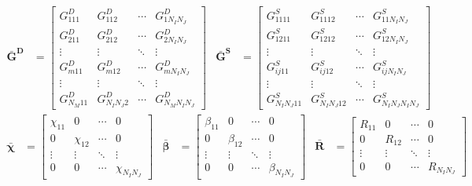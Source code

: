 			\begin{align}
				\mathbf{\bar{G}^D} &=	\begin{bmatrix}
														 G^D_{111} & G^D_{112} & \cdots & G^D_{1N_IN_J} \\
														 G^D_{211} & G^D_{212} & \cdots & G^D_{2N_IN_J} \\
														 \vdots & \vdots & \ddots & \vdots \\
													 	 G^D_{m11} & G^D_{m12} & \cdots & G^D_{mN_IN_J} \\
														 \vdots & \vdots & \ddots & \vdots \\
														 G^D_{N_M11} & G^D_{N_IN_J2} & \cdots & G^D_{N_MN_IN_J}
													 \end{bmatrix}
				&\mathbf{\bar{G}^S} &=	\begin{bmatrix}
															G^S_{1111} & G^S_{1112} & \cdots & G^S_{11N_IN_J} \\
															G^S_{1211} & G^S_{1212} & \cdots & G^S_{12N_IN_J} \\
															\vdots & \vdots & \ddots & \vdots \\
															G^S_{ij11} & G^S_{ij12} & \cdots & G^S_{ijN_IN_J} \\
															\vdots & \vdots & \ddots & \vdots \\
															G^S_{N_IN_J11} & G^S_{N_IN_J12} & \cdots & G^S_{N_IN_JN_IN_J}
														\end{bmatrix} \label{eq:3:discretization:collocation:17}
			\end{align}
			\begin{align}
				\boldsymbol{\bar{\chi}} &=	\begin{bmatrix}
															 \chi_{11} & 0 & \cdots & 0 \\
															 0 & \chi_{12} & \cdots & 0 \\
															 \vdots & \vdots & \ddots & \vdots \\
														 	 0 & 0 & \cdots & \chi_{N_IN_J}
														 \end{bmatrix}
				&\boldsymbol{\bar{\beta}} &=	\begin{bmatrix}
																	\beta_{11} & 0 & \cdots & 0 \\
																	0 & \beta_{12} & \cdots & 0 \\
																	\vdots & \vdots & \ddots & \vdots \\
																	0 & 0 & \cdots & \beta_{N_IN_J}
																\end{bmatrix}
				&\mathbf{\bar{R}} &=	\begin{bmatrix}
														R_{11} & 0 & \cdots & 0 \\
														0 & R_{12} & \cdots & 0 \\
														\vdots & \vdots & \ddots & \vdots \\
														0 & 0 & \cdots & R_{N_IN_J}
													\end{bmatrix} \label{eq:3:discretization:collocation:18}
			\end{align}
		
